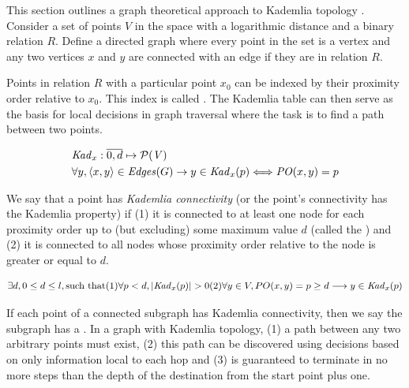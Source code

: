 This section outlines a graph theoretical  approach to Kademlia topology \cite{aspnes2007skip}.
Consider a set of points $V$ in the space with a logarithmic distance and 
a binary relation $R$. Define a directed graph where every point in the set is a vertex and any two vertices $x$ and $y$ are connected with an edge if they are in relation $R$. 


Points in relation $R$ with a particular point $x_0$ can be indexed by their proximity order relative to $x_0$. This index is called .
The Kademlia table can then serve as the basis for local decisions in graph traversal where the task is to find a path between two points. 


\begin{definition}\label{def:kademlia-table}
\begin{equation}
\begin{split}
&\mathit{Kad}_x: \overline{0,d} \mapsto \mathcal{P}(\mathit{V})\\
&\forall y, \langle x, y \rangle \in \mathit{Edges}(G) \rightarrow y \in \mathit{Kad}_x(p) \Longleftrightarrow \mathit{PO}(x,y)=p 
\end{split}
\end{equation}
\end{definition}

We say that a point has \emph{Kademlia connectivity} (or the point's connectivity has  the Kademlia property) if (1) it is connected to at least one node for each proximity order up to (but excluding) some maximum value $d$ (called the ) and (2) it is connected to all nodes whose proximity order relative to the node is greater or equal to $d$.

\begin{definition}\label{sec:kademlia-connectivity}
\begin{equation}
\exists d, 0\leq d \leq l, \text{such that}
\begin{subequations}
(1)\forall p<d, |\mathit{Kad}_x(p)|>0 \\
(2)\forall y\in V, PO(x,y)=p\geq d \longrightarrow y\in\mathit{Kad}_x(p) 
\end{subequations}
\end{equation}
\end{definition}


If each point of a connected subgraph has Kademlia connectivity, then we say the subgraph has a . In a graph with Kademlia topology, (1) a path between any two arbitrary points must exist, (2) this path can be discovered using decisions based on only information local to each hop and (3) is guaranteed to terminate in no more steps than the depth of the destination from the start point plus one. 

